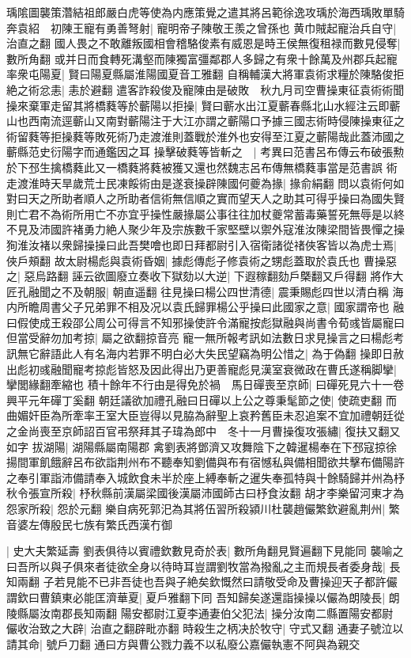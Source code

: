 瑀隂圖襲策濳結祖郎嚴白虎等使為内應策覺之遣其將呂範徐逸攻瑀於海西瑀敗單騎奔袁紹　初陳王寵有勇善弩射|{
	寵明帝子陳敬王羨之曾孫也}
黄巾賊起寵治兵自守|{
	治直之翻}
國人畏之不敢離叛國相會稽駱俊素有威恩是時王侯無復租禄而數見侵奪|{
	數所角翻}
或并日而食轉死溝壑而陳獨富彊鄰郡人多歸之有衆十餘萬及州郡兵起寵率衆屯陽夏|{
	賢曰陽夏縣屬淮陽國夏音工雅翻}
自稱輔漢大將軍袁術求糧於陳駱俊拒絶之術忿恚|{
	恚於避翻}
遣客詐殺俊及寵陳由是破敗　秋九月司空曹操東征袁術術聞操來棄軍走留其將橋蕤等於蘄陽以拒操|{
	賢曰蘄水出江夏蘄春縣北山水經注云即蘄山也西南流逕蘄山又南對蘄陽注于大江亦謂之蘄陽口予據三國志術時侵陳操東征之術留蕤等拒操蕤等敗死術乃走渡淮則蓋戰於淮外也安得至江夏之蘄陽哉此蓋沛國之蘄縣范史衍陽字而通鑑因之耳}
操擊破蕤等皆斬之　|{
	考異曰范書呂布傳云布破張勲於下邳生擒橋蕤此又一橋蕤將蕤被獲又還也然魏志呂布傳無橋蕤事當是范書誤}
術走渡淮時天旱歲荒士民凍餒術由是遂衰操辟陳國何夔為掾|{
	掾俞絹翻}
問以袁術何如對曰天之所助者順人之所助者信術無信順之實而望天人之助其可得乎操曰為國失賢則亡君不為術所用亡不亦宜乎操性嚴掾屬公事往往加杖夔常蓄毒藥誓死無辱是以終不見及沛國許褚勇力絶人聚少年及宗族數千家堅壁以禦外寇淮汝陳梁間皆畏憚之操狥淮汝褚以衆歸操操曰此吾樊噲也即日拜都尉引入宿衛諸從禇俠客皆以為虎士焉|{
	俠戶頰翻}
故太尉楊彪與袁術昏姻|{
	據彪傳彪子修袁術之甥彪蓋取於袁氏也}
曹操惡之|{
	惡烏路翻}
誣云欲圖廢立奏收下獄劾以大逆|{
	下遐稼翻劾戶槩翻又戶得翻}
將作大匠孔融聞之不及朝服|{
	朝直遥翻}
往見操曰楊公四世清德|{
	震秉賜彪四世以清白稱}
海内所瞻周書父子兄弟罪不相及况以袁氏歸罪楊公乎操曰此國家之意|{
	國家謂帝也}
融曰假使成王殺邵公周公可得言不知邪操使許令滿寵按彪獄融與尚書令荀彧皆屬寵曰但當受辭勿加考掠|{
	屬之欲翻掠音亮}
寵一無所報考訊如法數日求見操言之曰楊彪考訊無它辭語此人有名海内若罪不明白必大失民望竊為明公惜之|{
	為于偽翻}
操即日赦出彪初彧融聞寵考掠彪皆怒及因此得出乃更善寵彪見漢室衰微政在曹氏遂稱脚攣|{
	攣閭緣翻牽縮也}
積十餘年不行由是得免於禍　馬日磾喪至京師|{
	曰磾死見六十一卷興平元年磾丁奚翻}
朝廷議欲加禮孔融曰日磾以上公之尊秉髦節之使|{
	使疏吏翻}
而曲媚奸臣為所牽率王室大臣豈得以見脇為辭聖上哀矜舊臣未忍追案不宜加禮朝廷從之金尚喪至京師詔百官弔祭拜其子瑋為郎中　冬十一月曹操復攻張繡|{
	復扶又翻又如字}
拔湖陽|{
	湖陽縣屬南陽郡}
禽劉表將鄧濟又攻舞陰下之韓暹楊奉在下邳寇掠徐揚間軍飢餓辭呂布欲詣荆州布不聽奉知劉備與布有宿憾私與備相聞欲共擊布備陽許之奉引軍詣沛備請奉入城飲食未半於座上縛奉斬之暹失奉孤特與十餘騎歸并州為杼秋令張宣所殺|{
	杼秋縣前漢屬梁國後漢屬沛國師古曰杼食汝翻}
胡才李樂留河東才為怨家所殺|{
	怨於元翻}
樂自病死郭汜為其將伍習所殺潁川杜襲趙儼繁欽避亂荆州|{
	繁音婆左傳殷民七族有繁氏西漢冇御}


|{
	史大夫繁延壽}
劉表俱待以賓禮欽數見奇於表|{
	數所角翻見賢遍翻下見能同}
襲喻之曰吾所以與子俱來者徒欲全身以待時耳豈謂劉牧當為撥亂之主而規長者委身哉|{
	長知兩翻}
子若見能不已非吾徒也吾與子絶矣欽慨然曰請敬受命及曹操迎天子都許儼謂欽曰曹鎮東必能匡濟華夏|{
	夏戶雅翻下同}
吾知歸矣遂還詣操操以儼為朗陵長|{
	朗陵縣屬汝南郡長知兩翻}
陽安都尉江夏李通妻伯父犯法|{
	操分汝南二縣置陽安都尉}
儼收治致之大辟|{
	治直之翻辟毗亦翻}
時殺生之柄决於牧守|{
	守式又翻}
通妻子號泣以請其命|{
	號戶刀翻}
通曰方與曹公戮力義不以私廢公嘉儼執憲不阿與為親交

